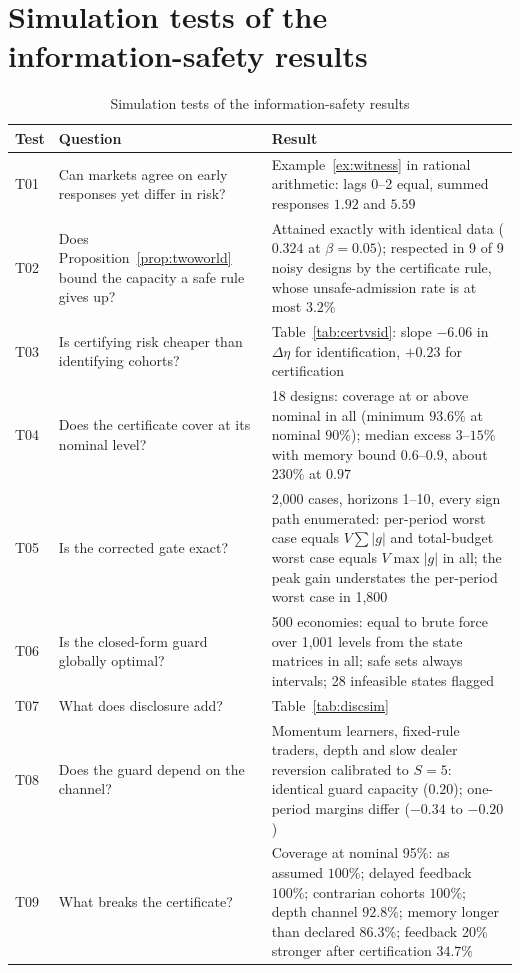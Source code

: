 \documentclass[12pt]{article}
\theoremstyle{definition}
\theoremstyle{remark}
\begin{document}
\section{Simulation tests of the information-safety results}
\begin{table}[!tbp]\centering\footnotesize
\begin{threeparttable}
\caption{Simulation tests of the information-safety results}\label{tab:simtests}
\setlength{\tabcolsep}{3pt}
\begin{tabular}{p{}p{}p{}}
\toprule
Test & Question & Result\\
\midrule
T01 & Can markets agree on early responses yet differ in risk? & Example~\ref{ex:witness} in rational arithmetic: lags 0--2 equal, summed responses $1.92$ and $5.59$\\
T02 & Does Proposition~\ref{prop:twoworld} bound the capacity a safe rule gives up? & Attained exactly with identical data ($0.324$ at $\beta=0.05$); respected in 9 of 9 noisy designs by the certificate rule, whose unsafe-admission rate is at most $3.2\%$\\
T03 & Is certifying risk cheaper than identifying cohorts? & Table~\ref{tab:certvsid}: slope $-6.06$ in $\Delta\eta$ for identification, $+0.23$ for certification\\
T04 & Does the certificate cover at its nominal level? & 18 designs: coverage at or above nominal in all (minimum $93.6\%$ at nominal $90\%$); median excess $3$--$15\%$ with memory bound $0.6$--$0.9$, about $230\%$ at $0.97$\\
T05 & Is the corrected gate exact? & 2{,}000 cases, horizons 1--10, every sign path enumerated: per-period worst case equals $V\sum|g|$ and total-budget worst case equals $V\max|g|$ in all; the peak gain understates the per-period worst case in 1{,}800\\
T06 & Is the closed-form guard globally optimal? & 500 economies: equal to brute force over 1{,}001 levels from the state matrices in all; safe sets always intervals; 28 infeasible states flagged\\
T07 & What does disclosure add? & Table~\ref{tab:discsim}\\
T08 & Does the guard depend on the channel? & Momentum learners, fixed-rule traders, depth and slow dealer reversion calibrated to $S=5$: identical guard capacity ($0.20$); one-period margins differ ($-0.34$ to $-0.20$)\\
T09 & What breaks the certificate? & Coverage at nominal 95\%: as assumed $100\%$; delayed feedback $100\%$; contrarian cohorts $100\%$; depth channel $92.8\%$; memory longer than declared $86.3\%$; feedback 20\% stronger after certification $34.7\%$\\

\end{tabular}
\end{threeparttable}
\end{table}
\end{document}
